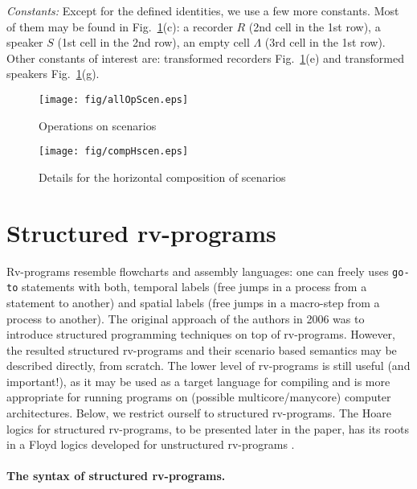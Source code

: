 \documentclass[runningheads]{llncs}
\newcommand{\1}{\u{a}}
\newcommand{\2}{\c{s}}
\newcommand{\5}{\c{t}}
\newcommand{\8}{\^{\i}}
\newcommand{\9}{\^{a}}
\begin{document}
{\em Constants:} Except for the defined identities, we use a few more constants. Most of them may be found in
Fig.~\ref{f654}(c): a recorder $R$ (2nd cell in the 1st row), a speaker $S$ (1st cell in the 2nd row), an
empty cell $\Lambda$ (3rd cell in the 1st row). Other constants of interest are: transformed recorders
Fig.~\ref{f654}(e) and transformed speakers Fig.~\ref{f654}(g).

\begin{figure}\begin{center}
\texttt{[image: fig/allOpScen.eps]}\vspace{-.5cm}\end{center}
\caption{Operations on scenarios}\label{f654}\end{figure}

\begin{figure}\begin{center}\texttt{[image: fig/compHscen.eps]}\vspace{-.5cm}\end{center}
\caption{Details for the horizontal composition of scenarios}\label{scenHcomp}\end{figure}

\section{Structured rv-programs}\label{s-srv}

Rv-programs \cite{ste06a} resemble flowcharts and assembly languages: one can freely uses {\tt go-to}
statements with both, temporal labels (free jumps in a process from a statement to another) and spatial labels
(free jumps in a macro-step from a process to another). The original approach of the authors in 2006 was to
introduce structured programming techniques on top of rv-programs.  However, the resulted structured
rv-programs and their scenario based semantics may be described directly, from scratch. The lower level of
rv-programs is still useful (and important!), as it may be used as a target language for compiling and is more
appropriate for running programs on (possible multicore/manycore) computer architectures. Below, we restrict
ourself to structured rv-programs. The Hoare logics for structured rv-programs, to be presented later in the
paper, has its roots in a Floyd logics developed for unstructured rv-programs \cite{ste06b}.

\paragraph{The syntax of structured rv-programs.}
\end{document}

